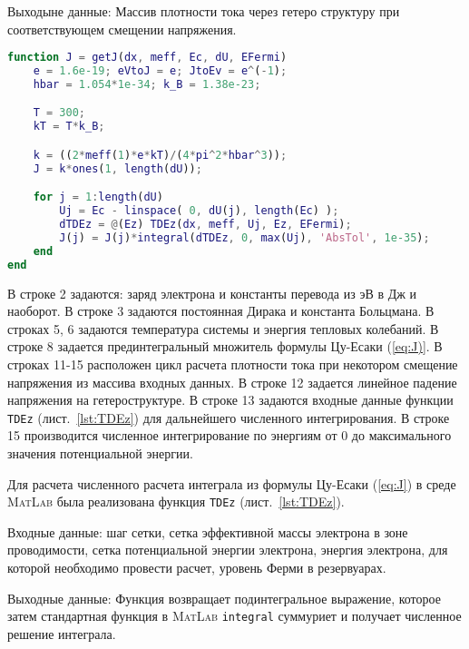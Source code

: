 Выходыне данные: Массив плотности тока через гетеро структуру при соответствующем смещении напряжения.

\begin{lstlisting}[style=realcode,language=Matlab,caption={Расчет плотности тока по формуле Цу-Есаки},label={lst:J}]
function J = getJ(dx, meff, Ec, dU, EFermi)
	e = 1.6e-19; eVtoJ = e; JtoEv = e^(-1); 
	hbar = 1.054*1e-34; k_B = 1.38e-23;

	T = 300;
	kT = T*k_B;

	k = ((2*meff(1)*e*kT)/(4*pi^2*hbar^3));
	J = k*ones(1, length(dU));

	for j = 1:length(dU)
		Uj = Ec - linspace( 0, dU(j), length(Ec) );
		dTDEz = @(Ez) TDEz(dx, meff, Uj, Ez, EFermi);
		J(j) = J(j)*integral(dTDEz, 0, max(Uj), 'AbsTol', 1e-35);
	end
end
\end{lstlisting}
В строке 2 задаются: заряд электрона и константы перевода из эВ в Дж и наоборот. В строке 3 задаются постоянная Дирака и константа Больцмана. В строках 5, 6 задаются температура системы и энергия тепловых колебаний. В строке 8 задается прединтегральный множитель формулы Цу-Есаки (\ref{eq:J)}. В строках 11-15 расположен цикл расчета плотности тока при некотором смещение напряжения из массива входных данных. В строке 12 задается линейное падение напряжения на гетероструктуре. В строке 13 задаются входные данные функции \texttt{TDEz} (лист.~\ref{lst:TDEz}) для дальнейшего численного интегрирования. В строке 15 производится численное интегрирование по энергиям от 0 до максимального значения потенциальной энергии.

Для расчета численного расчета интеграла из формулы Цу-Есаки (\ref{eq:J}) в среде \textsc{MatLab} была реализована функция \texttt{TDEz} (лист.~\ref{lst:TDEz}).

Входные данные: шаг сетки, сетка эффективной массы электрона в зоне проводимости, сетка потенциальной энергии электрона, энергия электрона, для которой необходимо провести расчет, уровень Ферми в резервуарах.

Выходные данные: Функция возвращает подинтегральное выражение, которое затем стандартная функция в \textsc{MatLab} \texttt{integral} суммуриет и получает численное решение интеграла.

